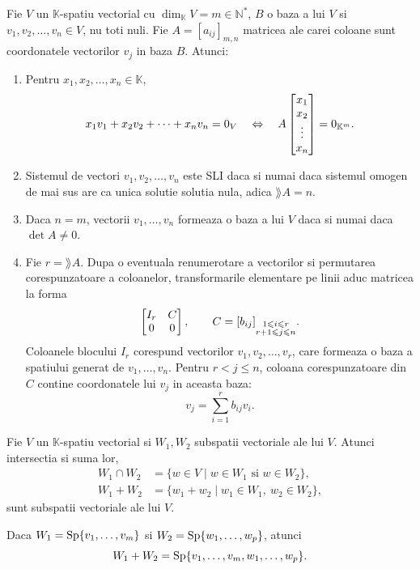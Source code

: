 \documentclass{article}
\begin{document}
\begin{enumerate}
\begin{tcolorbox}
  \teorema Fie $V$ un $\mathbb{K}$-spatiu vectorial cu $\dim_{\mathbb{K}} V = m \in \mathbb{N}^*$, $B$ o baza a lui $V$ si $v_1, v_2, \dots, v_n \in V$, nu toti nuli. Fie $A = [a_{ij}]_{m, n}$ matricea ale carei coloane sunt coordonatele vectorilor $v_j$ in baza $B$. Atunci:
  \begin{enumerate}
    \item Pentru $x_1, x_2, \dots, x_n \in \mathbb{K}$,
    \[
      x_1 v_1 + x_2 v_2 + \dots + x_n v_n = 0_V
      \quad\Leftrightarrow\quad
      A \begin{bmatrix}x_1 \\ x_2 \\ \vdots \\ x_n\end{bmatrix} = 0_{\mathbb{K}^m}.
    \]
    \item Sistemul de vectori $v_1, v_2, \dots, v_n$ este SLI daca si numai daca sistemul omogen de mai sus are ca unica solutie solutia nula, adica $\rang A = n$.
    \item Daca $n=m$, vectorii $v_1,\dots,v_n$ formeaza o baza a lui $V$ daca si numai daca $\det A\ne 0$.
    \item Fie $r = \rang A$. Dupa o eventuala renumerotare a vectorilor si permutarea corespunzatoare a coloanelor, transformarile elementare pe linii aduc matricea la forma
    \[
      \begin{bmatrix}I_r & C \\ 0 & 0\end{bmatrix},
      \qquad C = [b_{ij}]_{\substack{1 \leqslant i \leqslant r \\ r+1 \leqslant j \leqslant n}}.
    \]
    Coloanele blocului $I_r$ corespund vectorilor $v_1, v_2, \dots, v_r$, care formeaza o baza a spatiului generat de $v_1,\dots,v_n$. Pentru $r < j \leq n$, coloana corespunzatoare din $C$ contine coordonatele lui $v_j$ in aceasta baza:
    \[
      v_j = \sum_{i=1}^r b_{ij}v_i.
    \]
  \end{enumerate}
\end{tcolorbox}

  \propozitie Fie $V$ un $\mathbb{K}$-spatiu vectorial si $W_1, W_2$ subspatii vectoriale ale lui $V$. Atunci intersectia si suma lor,
  \begin{align*}
    W_1 \cap W_2 &= \{w \in V \mid w \in W_1 \text{ si } w \in W_2\}, \\
    W_1 + W_2 &= \{w_1 + w_2 \mid w_1 \in W_1,\ w_2 \in W_2\},
  \end{align*}
  sunt subspatii vectoriale ale lui $V$.

  \observatie Daca $W_1 = \operatorname{Sp}\{v_1, \dots, v_m\}$ si $W_2 = \operatorname{Sp}\{w_1, \dots, w_p\}$, atunci
  \[
    W_1 + W_2 = \operatorname{Sp}\{v_1, \dots, v_m, w_1, \dots, w_p\}.
  \]


\end{enumerate}
\end{document}
